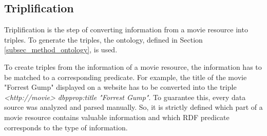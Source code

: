 \subsection{Triplification}
\label{subsec_method_triplification}

Triplification is the step of converting information from a movie resource into triples.
To generate the triples, the ontology, defined in Section \ref{subsec_method_ontology}, is used.

To create triples from the information of a movie resource, the information has to be matched to a corresponding predicate.
For example, the title of the movie "Forrest Gump" displayed on a website has to be converted into the triple \emph{<http://movie> dbpprop:title "Forrest Gump"}.
To guarantee this, every data source was analyzed and parsed manually.
So, it is strictly defined which part of a movie resource contains valuable information and which RDF predicate corresponds to the type of information.